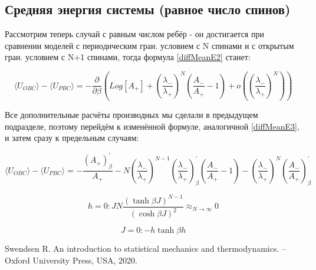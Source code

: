 \documentclass{article}
\newcommand{\bj}{\beta J}
\newcommand{\bh}{\beta h}
\newcommand{\lp}{\lambda_{+}}
\newcommand{\lm}{\lambda_{-}}
\newcommand{\ap}{A_{+}}
\newcommand{\am}{A_{-}}
\newcommand{\pbc}{_{PBC}}
\newcommand{\obc}{_{OBC}}
\newcommand{\prpb}{^{'}_{\beta}}
\newcommand{\la}{\langle}
\newcommand{\ra}{\rangle}
\numberwithin{equation}{section}
\begin{document}
\subsection{Средняя энергия системы (равное число спинов)}

Рассмотрим теперь случай с равным числом ребёр - он достигается при сравнении моделей с периодическим гран. условием с N спинами и с открытым гран. условием с N+1 спинами, тогда формула \eqref{diffMeanE2} станет:

\begin{equation}\label{diffMeanER1}
    \la U\obc \ra - \la U\pbc \ra = -\frac{\partial}{\partial \beta}\left(Log[\ap]+(\frac{\lm}{\lp})^{N}(\frac{\am}{\ap} - 1) + o((\frac{\lambda_{-}}{\lambda_{+}})^{N})\right)    
\end{equation}

Все дополнительные расчёты производных мы сделали в предыдущем подразделе, поэтому перейдём к изменённой формуле, аналогичной \eqref{diffMeanE3}, и затем сразу к предельным случаям:

\begin{equation}\label{diffMeanER2}
    \la U\obc \ra - \la U\pbc \ra = -\frac{(\ap)\prpb}{\ap} - N(\frac{\lm}{\lp})^{N-1}(\frac{\lm}{\lp})\prpb (\frac{\am}{\ap} - 1) - (\frac{\lm}{\lp})^{N}(\frac{\am}{\ap})\prpb
\end{equation}

\[ h = 0: JN\frac{(\tanh{\bj})^{N-1}}{(\cosh{\bj})^{2}} \approx_{N\to\infty} 0 \]

\[ J = 0: -h\tanh{\bh}\]

\begin{thebibliography}{9}
 Swendsen R. An introduction to statistical mechanics and thermodynamics. – Oxford University Press, USA, 2020.
\end{thebibliography}
\end{document}
